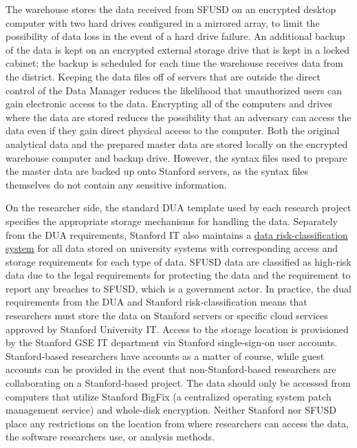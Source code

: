 \documentclass[
]{book}
\begin{document}
The warehouse stores the data received from SFUSD on an encrypted desktop computer with two hard drives configured in a mirrored array, to limit the possibility of data loss in the event of a hard drive failure. An additional backup of the data is kept on an encrypted external storage drive that is kept in a locked cabinet; the backup is scheduled for each time the warehouse receives data from the district. Keeping the data files off of servers that are outside the direct control of the Data Manager reduces the likelihood that unauthorized users can gain electronic access to the data. Encrypting all of the computers and drives where the data are stored reduces the possibility that an adversary can access the data even if they gain direct physical access to the computer. Both the original analytical data and the prepared master data are stored locally on the encrypted warehouse computer and backup drive. However, the syntax files used to prepare the master data are backed up onto Stanford servers, as the syntax files themselves do not contain any sensitive information.

On the researcher side, the standard DUA template used by each research project specifies the appropriate storage mechanisms for handling the data. Separately from the DUA requirements, Stanford IT also maintains a \href{https://uit.stanford.edu/guide/riskclassifications}{data risk-classification system} for all data stored on university systems with corresponding access and storage requirements for each type of data. SFUSD data are classified as high-risk data due to the legal requirements for protecting the data and the requirement to report any breaches to SFUSD, which is a government actor. In practice, the dual requirements from the DUA and Stanford risk-classification means that researchers must store the data on Stanford servers or specific cloud services approved by Stanford University IT. Access to the storage location is provisioned by the Stanford GSE IT department via Stanford single-sign-on user accounts. Stanford-based researchers have accounts as a matter of course, while guest accounts can be provided in the event that non-Stanford-based researchers are collaborating on a Stanford-based project. The data should only be accessed from computers that utilize Stanford BigFix (a centralized operating system patch management service) and whole-disk encryption. Neither Stanford nor SFUSD place any restrictions on the location from where researchers can access the data, the software researchers use, or analysis methods.
\end{document}
